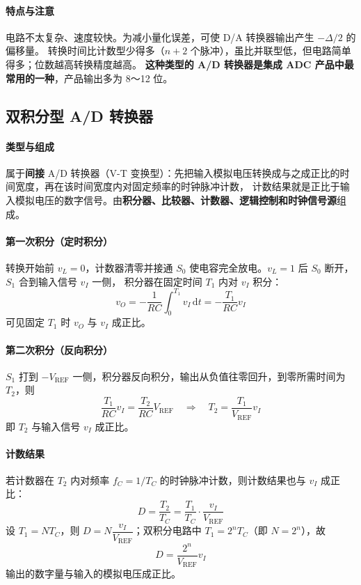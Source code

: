 \paragraph{特点与注意}
电路不太复杂、速度较快。为减小量化误差，可使 D/A 转换器输出产生 $-\Delta/2$ 的偏移量。
转换时间比计数型少得多（$n+2$ 个脉冲），虽比并联型低，但电路简单得多；位数越高转换精度越高。
\textbf{这种类型的 A/D 转换器是集成 ADC 产品中最常用的一种}，产品输出多为 8～12 位。

\subsection{双积分型 A/D 转换器}
\paragraph{类型与组成}
属于\textbf{间接} A/D 转换器（V-T 变换型）：先把输入模拟电压转换成与之成正比的时间宽度，再在该时间宽度内对固定频率的时钟脉冲计数，
计数结果就是正比于输入模拟电压的数字信号。由\textbf{积分器、比较器、计数器、逻辑控制和时钟信号源}组成。

\paragraph{第一次积分（定时积分）}
转换开始前 $v_L=0$，计数器清零并接通 $S_0$ 使电容完全放电。$v_L=1$ 后 $S_0$ 断开，$S_1$ 合到输入信号 $v_I$ 一侧，
积分器在固定时间 $T_1$ 内对 $v_I$ 积分：
\[
v_O=-\frac{1}{RC}\int_0^{T_1}v_I\,\mathrm{d}t=-\frac{T_1}{RC}v_I
\]
可见固定 $T_1$ 时 $v_O$ 与 $v_I$ 成正比。

\paragraph{第二次积分（反向积分）}
$S_1$ 打到 $-V_\text{REF}$ 一侧，积分器反向积分，输出从负值往零回升，到零所需时间为 $T_2$，则
\[
\frac{T_1}{RC}v_I=\frac{T_2}{RC}V_\text{REF}\quad\Longrightarrow\quad
T_2=\frac{T_1}{V_\text{REF}}v_I
\]
即 $T_2$ 与输入信号 $v_I$ 成正比。

\paragraph{计数结果}
若计数器在 $T_2$ 内对频率 $f_C=1/T_C$ 的时钟脉冲计数，则计数结果也与 $v_I$ 成正比：
\[
D=\frac{T_2}{T_C}=\frac{T_1}{T_C}\cdot\frac{v_I}{V_\text{REF}}
\]
设 $T_1=NT_C$，则 $D=N\dfrac{v_I}{V_\text{REF}}$；双积分电路中 $T_1=2^nT_C$（即 $N=2^n$），故
\[
D=\frac{2^n}{V_\text{REF}}v_I
\]
输出的数字量与输入的模拟电压成正比。

